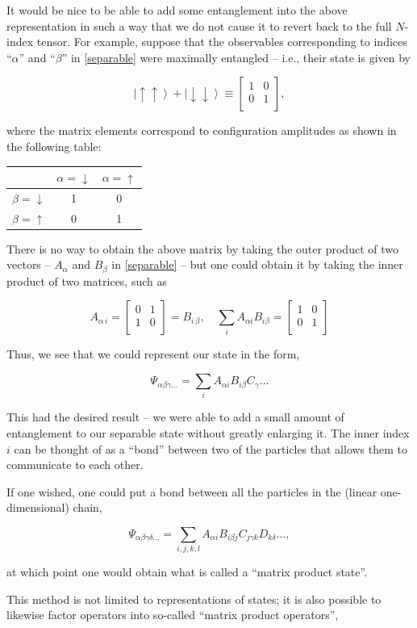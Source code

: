 \documentclass[12pt]{amsbook}
\theoremstyle{plain}
\theoremstyle{definition}
\theoremstyle{remark}
\newcommand{\bmat}[4]{
\begin{bmatrix}
#1 & #2\\
#3 & #4\\
\end{bmatrix}
}
\newcommand{\eqn}[2][]{\begin{equation}\label{#1}#2\end{equation}}
\newcommand{\ket}[1]{\left|#1\right>}
\begin{document}
It would be nice to be able to add some entanglement into the above representation in such a way that we do not cause it to revert back to the full $N$-index tensor.  For example, suppose that the observables corresponding to indices ``$\alpha$'' and ``$\beta$'' in \eqref{separable} were maximally entangled -- i.e., their state is given by

$$\ket{\uparrow\uparrow}+\ket{\downarrow\downarrow} \equiv
\bmat{1}{0}{0}{1},
$$

\noindent where the matrix elements correspond to configuration amplitudes as shown in the following table:

\begin{center}
\begin{tabular}{c||c|c}
               & $\alpha=\downarrow$ & $\alpha=\uparrow$ \\
\hline
\hline
$\beta=\downarrow$ &       1        &       0      \\
\hline
$\beta=\uparrow$   &       0        &       1
\end{tabular}
\end{center}

There is no way to obtain the above matrix by taking the outer product of two vectors -- $A_\alpha$ and $B_\beta$ in \eqref{separable} -- but one could obtain it by taking the inner product of two matrices, such as

$$A_{\alpha\,i} = \bmat{0}{1}{1}{0} = B_{i\,\beta}, \quad \sum_i A_{\alpha i} B_{i \beta} = \bmat{1}{0}{0}{1} $$

Thus, we see that we could represent our state in the form,

$$\Psi_{\alpha\beta\gamma\dots} = \sum_i A_{\alpha i} B_{i\beta} C_\gamma \dots$$

This had the desired result -- we were able to add a small amount of entanglement to our separable state without greatly enlarging it.  The inner index $i$ can be thought of as a ``bond'' between two of the particles that allows them to communicate to each other.

If one wished, one could put a bond between all the particles in the (linear one-dimensional) chain,

\eqn[mps-oldnotation]{\Psi_{\alpha\beta\gamma\delta\dots} = \sum_{i,j,k,l} A_{\alpha i} B_{i \beta j} C_{j \gamma k} D_{k \delta} \dots,}

\noindent at which point one would obtain what is called a ``matrix product state''.

This method is not limited to representations of states; it is also possible to likewise factor operators into so-called ``matrix product operators'',
\end{document}
